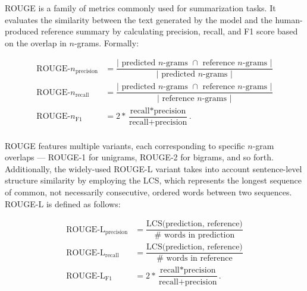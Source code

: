 \ac{ROUGE} is a family of metrics commonly used for summarization tasks. It evaluates the similarity between the text generated by the model and the human-produced reference summary by calculating precision, recall, and F1 score based on the overlap in $n$-grams. Formally:

\begin{equation}
\begin{aligned}
    \text{ROUGE-}n_{\text{precision}} &= \dfrac{\vert \text{ predicted } n\text{-grams } \cap \text{ reference } n\text{-grams } \vert}{\vert \text{ predicted } n\text{-grams } \vert} \\
    \text{ROUGE-}n_{\text{recall}} &= \dfrac{\vert \text{ predicted } n\text{-grams } \cap \text{ reference } n\text{-grams } \vert}{\vert \text{ reference } n\text{-grams } \vert} \\
    \text{ROUGE-}n_{\text{F1}} &= 2 * \dfrac{\text{recall} * \text{precision}}{\text{recall} + \text{precision}}. \\
\end{aligned}
\end{equation}


\noindent \ac{ROUGE} features multiple variants, each corresponding to specific $n$-gram overlaps — \ac{ROUGE}-1 for unigrams, \ac{ROUGE}-2 for bigrams, and so forth. Additionally, the widely-used ROUGE-L variant takes into account sentence-level structure similarity by employing the \ac{LCS}, which represents the longest sequence of common, not necessarily consecutive, ordered words between two sequences. \ac{ROUGE}-L is defined as follows:

\begin{equation}
    \begin{aligned}
        \text{ROUGE-L}_{\text{precision}} &= \dfrac{\text{LCS(prediction, reference)}}{\# \text{ words in prediction}} \\
        \text{ROUGE-L}_{\text{recall}} &= \dfrac{\text{LCS(prediction, reference)}}{\# \text{ words in reference}} \\
        \text{ROUGE-L}_{\text{F1}} &= 2 * \dfrac{\text{recall} * \text{precision}}{\text{recall} + \text{precision}}. \\
\end{aligned}
\end{equation}
    
